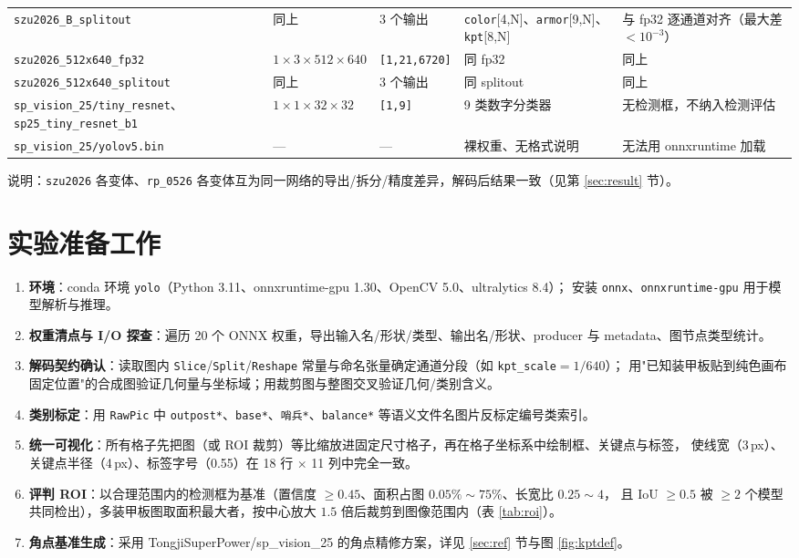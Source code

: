 \documentclass[11pt,a4paper]{ctexart}
\newcommand{\code}[1]{\texttt{\small #1}}
\begin{document}
{\begin{longtable}{@{}p{4.2cm} p{2.2cm} p{2.0cm} p{3.6cm} p{3.9cm}@{}}
\code{szu2026\_B\_splitout} & 同上 & 3 个输出 & \code{color}[4,N]、\code{armor}[9,N]、\code{kpt}[8,N] &
与 fp32 逐通道对齐（最大差 $<10^{-3}$）\\
\code{szu2026\_512x640\_fp32} & $1\times3\times512\times640$ & \code{[1,21,6720]} & 同 fp32 & 同上 \\
\code{szu2026\_512x640\_splitout} & 同上 & 3 个输出 & 同 splitout & 同上 \\
\midrule
\code{sp\_vision\_25/tiny\_resnet}、\code{sp25\_tiny\_resnet\_b1} & $1\times1\times32\times32$ & \code{[1,9]} &
9 类数字分类器 & 无检测框，不纳入检测评估 \\
\code{sp\_vision\_25/yolov5.bin} & --- & --- & 裸权重、无格式说明 & 无法用 onnxruntime 加载 \\
\end{longtable}}

\noindent 说明：\code{szu2026} 各变体、\code{rp\_0526} 各变体互为同一网络的导出/拆分/精度差异，解码后结果一致（见第 \ref{sec:result} 节）。

\section{实验准备工作}
\begin{enumerate}\itemsep2pt
  \item \textbf{环境}：conda 环境 \code{yolo}（Python 3.11、onnxruntime-gpu 1.30、OpenCV 5.0、ultralytics 8.4）；
        安装 \code{onnx}、\code{onnxruntime-gpu} 用于模型解析与推理。
  \item \textbf{权重清点与 I/O 探查}：遍历 20 个 ONNX 权重，导出输入名/形状/类型、输出名/形状、producer 与 metadata、图节点类型统计。
  \item \textbf{解码契约确认}：读取图内 \code{Slice}/\code{Split}/\code{Reshape} 常量与命名张量确定通道分段（如 \code{kpt\_scale}$=1/640$）；
        用"已知装甲板贴到纯色画布固定位置"的合成图验证几何量与坐标域；用裁剪图与整图交叉验证几何/类别含义。
  \item \textbf{类别标定}：用 \code{RawPic} 中 \code{outpost*}、\code{*base*}、\code{哨兵*}、\code{balance*} 等语义文件名图片反标定编号类索引。
  \item \textbf{统一可视化}：所有格子先把图（或 ROI 裁剪）等比缩放进固定尺寸格子，再在格子坐标系中绘制框、关键点与标签，
        使线宽（3\,px）、关键点半径（4\,px）、标签字号（0.55）在 18 行 $\times$ 11 列中完全一致。
  \item \textbf{评判 ROI}：以合理范围内的检测框为基准（置信度 $\ge 0.45$、面积占图 $0.05\%\sim75\%$、长宽比 $0.25\sim4$，
        且 IoU $\ge 0.5$ 被 $\ge 2$ 个模型共同检出），多装甲板图取面积最大者，按中心放大 $1.5$ 倍后裁剪到图像范围内（表 \ref{tab:roi}）。
  \item \textbf{角点基准生成}：采用 TongjiSuperPower/sp\_vision\_25 的角点精修方案，详见 \ref{sec:ref} 节与图 \ref{fig:kptdef}。
\end{enumerate}
\end{document}
